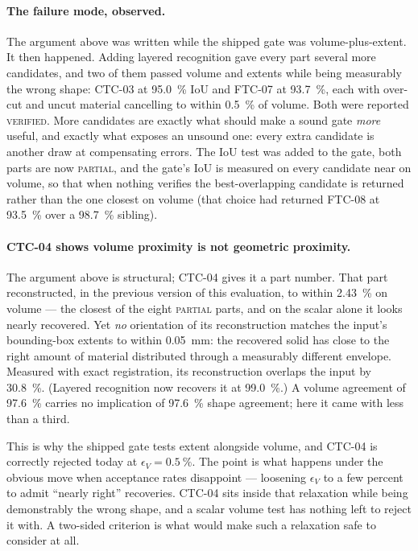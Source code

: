 \documentclass[11pt]{article}
\newcommand{\VERIFIED}{\textsc{verified}}
\newcommand{\PARTIAL}{\textsc{partial}}
\begin{document}
\paragraph{The failure mode, observed.} The argument above was written while
the shipped gate was volume-plus-extent. It then happened. Adding layered
recognition gave every part several more candidates, and two of them passed
volume and extents while being measurably the wrong shape: CTC-03 at
\SI{95.0}{\percent} IoU and FTC-07 at \SI{93.7}{\percent}, each with
over-cut and uncut material cancelling to within \SI{0.5}{\percent} of volume. Both
were reported \VERIFIED{}. More candidates are exactly what should make a sound
gate \emph{more} useful, and exactly what exposes an unsound one: every extra
candidate is another draw at compensating errors. The IoU test was added to the
gate, both parts are now \PARTIAL{}, and the gate's IoU is measured on every
candidate near on volume, so that when nothing verifies the best-overlapping
candidate is returned rather than the one closest on volume (that choice had
returned FTC-08 at \SI{93.5}{\percent} over a \SI{98.7}{\percent} sibling).

\paragraph{CTC-04 shows volume proximity is not geometric proximity.} The
argument above is structural; CTC-04 gives it a part number. That part
reconstructed, in the previous version of this evaluation, to within \SI{2.43}{\percent} on volume --- the closest of the
eight \PARTIAL{} parts, and on the scalar alone it looks nearly recovered. Yet
\emph{no} orientation of its reconstruction matches the input's bounding-box
extents to within \SI{0.05}{\milli\metre}: the recovered solid has close to the
right amount of material distributed through a measurably different envelope.
Measured with exact registration, its reconstruction overlaps the input by
\SI{30.8}{\percent}. (Layered recognition now recovers it at
\SI{99.0}{\percent}.) A volume agreement of \SI{97.6}{\percent} carries no
implication of \SI{97.6}{\percent} shape agreement; here it came with less than a
third.

This is why the shipped gate tests extent alongside volume, and CTC-04 is
correctly rejected today at $\epsilon_V = \SI{0.5}{\percent}$. The point is what
happens under the obvious move when acceptance rates disappoint --- loosening
$\epsilon_V$ to a few percent to admit ``nearly right'' recoveries. CTC-04 sits
inside that relaxation while being demonstrably the wrong shape, and a scalar
volume test has nothing left to reject it with. A two-sided criterion is what
would make such a relaxation safe to consider at all.
\end{document}
